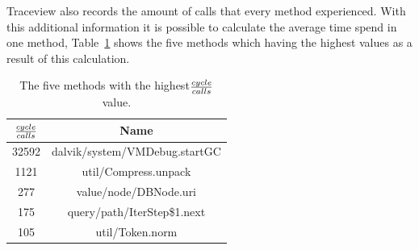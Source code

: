 Traceview also records the amount of calls that every method experienced.
With this additional information it is possible to calculate the average time spend in one method, Table~\ref{tab:tob-five-cycle-call} shows the five methods which having the highest values as a result of this calculation.
\begin{table}[htpb]
	\centering
	\begin{tabular}{|c|c|}
		\hline
		${cycle \over calls}$&Name\\
		\hline
		32592&dalvik/system/VMDebug.startGC\\
		\hline
		1121&util/Compress.unpack\\
		\hline
		277&value/node/DBNode.uri\\
		\hline
		175&query/path/IterStep\$1.next\\
		\hline
		105&util/Token.norm\\
		\hline
	\end{tabular}
	\caption{The five methods with the highest${cycle \over calls}$ value.}
	\label{tab:tob-five-cycle-call}
\end{table}

